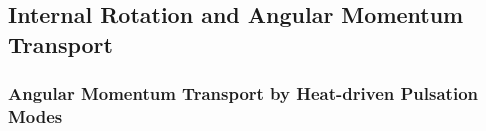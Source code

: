 
\subsection{Internal Rotation and Angular Momentum Transport}


{\color{brown}
\subsubsection{Angular Momentum Transport by Heat-driven Pulsation Modes}





}


